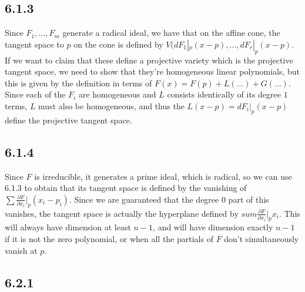 \documentclass{article}
\begin{document}
\subsection*{6.1.3}
Since $F_1,\ldots,F_m$ generate a radical ideal, we have that on the affine cone, the tangent space to $p$ on the cone is defined by $V(dF_1|_p(x-p),\ldots,dF_r|_p(x-p)$. If we want to claim that these define a projective variety which is the projective tangent space, we need to show that they're homogeneous linear polynomials, but this is given by the definition in terms of $F(x)=F(p)+L(\ldots)+G(\ldots)$. Since each of the $F_i$ are homogeneous and $L$ consists identically of its degree $1$ terms, $L$ must also be homogeneous, and thus the $L(x-p)=dF_i|_p(x-p)$ define the projective tangent space.
\subsection*{6.1.4}
Since $F$ is irreducible, it generates a prime ideal, which is radical, so we can use 6.1.3 to obtain that its tangent space is defined by the vanishing of $\sum\frac{\partial F}{\partial x_i}\Big|_p(x_i-p_i)$. Since we are guaranteed that the degree $0$ part of this vanishes, the tangent space is actually the hyperplane defined by $sum\frac{\partial F}{\partial x_i}\Big|_px_i$. This will always have dimension at least $n-1$, and will have dimension exactly $n-1$ if it is not the zero polynomial, or when all the partials of $F$ don't simultaneously vanish at $p$.
\subsection*{6.2.1}

    
\end{document}
